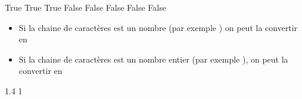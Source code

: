 \documentclass[letterpaper,10pt,french]{sphinxmanual}
\begin{document}
\begin{sphinxVerbatim}[commandchars=\\\{\}]

\PYG{p}{[}\PYG{p}{]}
\end{sphinxVerbatim}

\begin{sphinxVerbatim}[commandchars=\\\{\}]
True
True
True
False
False
False
False
False
\end{sphinxVerbatim}
\begin{itemize}
\item {} 
\sphinxAtStartPar
Si la chaine de caractères est un nombre (par exemple ) on peut la convertir en 

\item {} 
\sphinxAtStartPar
Si la chaine de caractères est un nombre entier (par exemple ), on peut la convertir en 

\end{itemize}

\begin{sphinxVerbatim}[commandchars=\\\{\}]
\end{sphinxVerbatim}

\begin{sphinxVerbatim}[commandchars=\\\{\}]
1.4
1
\end{sphinxVerbatim}
\end{document}
